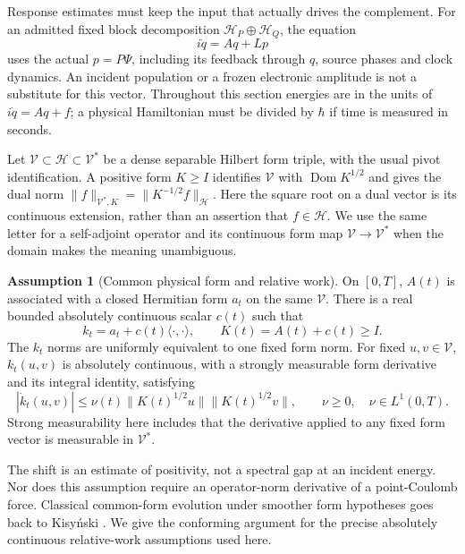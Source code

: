 \documentclass[11pt]{article}
\numberwithin{equation}{section}
\theoremstyle{definition}
\newtheorem{assumption}[theorem]{Assumption}
\theoremstyle{remark}
\begin{document}
Response estimates must keep the input that actually drives the
complement. For an admitted fixed block decomposition
$\mathcal H_P\oplus\mathcal H_Q$, the equation
\[
 i\dot q=Aq+Lp
\]
uses the actual $p=P\Psi$, including its feedback through $q$,
source phases and clock dynamics. An incident population or a
frozen electronic amplitude is not a substitute for this vector.
Throughout this section energies are in the units of
$i\dot q=Aq+f$; a physical Hamiltonian must be divided by
$\hbar$ if time is measured in seconds.

Let $\mathcal V\subset\mathcal H\subset\mathcal V^*$ be a
dense separable Hilbert form triple, with the usual pivot
identification. A positive form $K\ge I$ identifies $\mathcal V$
with $\operatorname{Dom}K^{1/2}$ and gives the dual norm
$\|f\|_{\mathcal V^*,K}=\|K^{-1/2}f\|_{\mathcal H}$.
Here the square root on a dual vector is its continuous
extension, rather than an assertion that $f\in\mathcal H$.
We use the same letter for a self-adjoint operator and its
continuous form map $\mathcal V\to\mathcal V^*$ when the
domain makes the meaning unambiguous.

\begin{assumption}[Common physical form and relative work]
\label{p4f:ass:forms}
On $[0,T]$, $A(t)$ is associated with a closed Hermitian
form $a_t$ on the same $\mathcal V$. There is a real bounded
absolutely continuous scalar $c(t)$ such that
\[
 k_t=a_t+c(t)\langle\cdot,\cdot\rangle,\qquad K(t)=A(t)+c(t)\ge I.
\]
The $k_t$ norms are uniformly equivalent to one fixed form norm.
For fixed $u,v\in\mathcal V$, $k_t(u,v)$ is absolutely
continuous, with a strongly measurable form derivative and
its integral identity, satisfying
\begin{equation}\label{p4f:eq:relativework}
 |\dot k_t(u,v)|
 \le \nu(t)\|K(t)^{1/2}u\|\|K(t)^{1/2}v\|,
 \qquad \nu\ge0,\quad \nu\in L^1(0,T).
\end{equation}
Strong measurability here includes that the derivative applied
to any fixed form vector is measurable in $\mathcal V^*$.
\end{assumption}

The shift is an estimate of positivity, not a spectral gap at
an incident energy. Nor does this assumption require an
operator-norm derivative of a point-Coulomb force.
Classical common-form evolution under smoother form
hypotheses goes back to Kisy\'nski \cite{Kisynski1964}.
We give the conforming argument for the precise
absolutely continuous relative-work assumptions used here.
\end{document}
